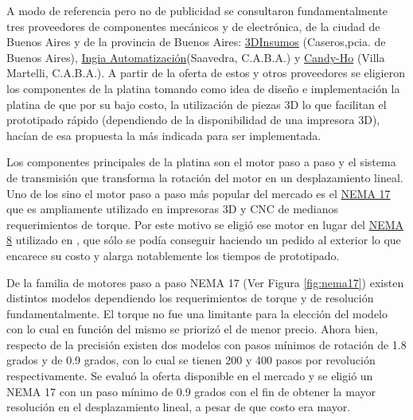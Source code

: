 A modo de referencia pero no de publicidad se consultaron fundamentalmente tres proveedores de componentes mecánicos y de electrónica, de la ciudad de Buenos Aires y de la provincia de Buenos Aires: \href{https://3dinsumos.com.ar/}{3DInsumos} (Caseros,pcia. de Buenos Aires), \href{https://ingia.com.ar/}{Ingia Automatización}(Saavedra, C.A.B.A.) y \href{https://candy-ho.com/}{Candy-Ho} (Villa Martelli, C.A.B.A.). A partir de la oferta de estos y otros proveedores se eligieron los componentes de la platina tomando como idea de diseño e implementación la platina de \cite{schaa} que por su bajo costo, la utilización de piezas 3D lo que facilitan el prototipado rápido (dependiendo de la disponibilidad de una impresora 3D), hacían de esa propuesta la más indicada para ser implementada.

Los componentes principales de la platina son el motor paso a paso y el sistema de transmisión que transforma la rotación del motor en un desplazamiento lineal. Uno de los sino el motor paso a paso más popular del mercado es el \href{https://www.pololu.com/product/1200}{NEMA 17} que es ampliamente utilizado en impresoras 3D y CNC de medianos requerimientos de torque. Por este motivo se eligió ese motor en lugar del \href{https://www.pololu.com/product/1204}{NEMA 8} utilizado en \cite{schaa}, que sólo se podía conseguir haciendo un pedido al exterior lo que encarece su costo y alarga notablemente los tiempos de prototipado.

De la familia de motores paso a paso NEMA 17 (Ver Figura \ref{fig:nema17}) existen distintos modelos dependiendo los requerimientos de torque y de resolución fundamentalmente. El torque no fue una limitante para la elección del modelo con lo cual en función del mismo se priorizó el de menor precio. Ahora bien, respecto de la precisión existen dos modelos con pasos mínimos de rotación de 1.8 grados y de 0.9 grados, con lo cual se tienen 200 y 400 pasos por revolución respectivamente. Se evaluó la oferta disponible en el mercado y se eligió un NEMA 17 con un paso mínimo de 0.9 grados con el fin de obtener la mayor resolución en el desplazamiento lineal, a pesar de que costo era mayor.

